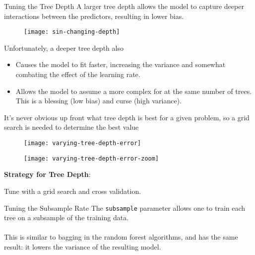 %
\begin{frame}{Tuning the Tree Depth}
A larger tree depth allows the model to capture deeper interactions between the predictors, resulting in lower bias.

  \begin{figure}
    \texttt{[image: sin-changing-depth]}
  \end{figure}

\end{frame}
%
\begin{frame}
Unfortunately, a deeper tree depth also

\begin{itemize}
  \item Causes the model to fit faster, increasing the variance and somewhat combating the effect of the learning rate.
  \item Allows the model to assume a more complex for at the same number of trees.  This is a blessing (low bias) and curse (high variance).
\end{itemize}
\end{frame}
%
\begin{frame}
It's never obvious up front what tree depth is best for a given problem, so a grid search is needed to determine the best value

  \begin{figure}
    \texttt{[image: varying-tree-depth-error]}
  \end{figure}
  
\end{frame}
%
\begin{frame}

  \begin{figure}
    \texttt{[image: varying-tree-depth-error-zoom]}
  \end{figure}
  
\end{frame}
%
\begin{frame}
\textbf{Strategy for Tree Depth}:

Tune with a grid search and cross validation.
  
\end{frame}
%
\begin{frame}{Tuning the Subsample Rate}
The \texttt{subsample} parameter allows one to train each tree on a subsample of the training data.\\~\\

This is similar to bagging in the random forest algorithms, and has the same result: it lowers the variance of the resulting model.
\end{frame}
